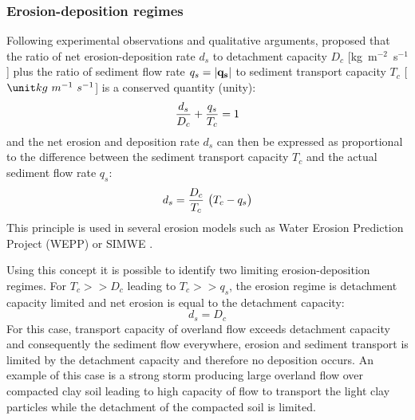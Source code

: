 \documentclass[gmd, manuscript]{copernicus}
\begin{document}
\subsubsection{Erosion-deposition regimes}

Following experimental observations and qualitative arguments, \cite{Foster1977} 
proposed that the ratio of net erosion-deposition rate $d_s$ to detachment
 capacity  $D_c$  [\unit{kg~m}$^{-2}$~\unit{s}$^{-1}$] 
 plus the ratio of sediment flow rate $q_s = |{\bf q_s}|$ 
to sediment transport capacity $T_c$ [$\unit kg~m^{-1}~s^{-1}$] is
 a conserved quantity (unity):
\begin{equation}
\label{eq:foster_law}
{d_s \over D_c} + {q_s \over T_c} = 1
\end{equation}
and the net erosion and deposition rate $d_s$ can then be expressed as proportional to the difference between
the sediment transport capacity $T_c$ and the actual sediment flow rate $q_s$:
\begin{equation}
\label{eq:sigma}
d_s = {D_c \over T_c}~\bigl( T_c - q_s\bigr)
\end{equation}
\noindent
This principle is used in several erosion models such as Water Erosion Prediction Project (WEPP)
\citep{Flanagan2013} or SIMWE \citep{Mitas1998}. 

Using this concept it is possible to identify two limiting erosion-deposition regimes.
For $T_c >> D_c$ leading to $T_c >> q_s$, the erosion regime is detachment capacity limited and
net erosion is equal to the detachment capacity:
\begin{equation}
\label{eq:detachment_limited}
 d_s = D_c
\end{equation}
For this case, transport capacity of overland flow exceeds
detachment capacity and consequently the sediment flow everywhere, 
erosion and sediment transport is limited by the detachment
capacity and therefore no deposition occurs.
An example of this case is a strong storm producing large overland flow over compacted clay soil 
leading to high capacity of flow to transport the light clay particles
while the detachment of the compacted soil is limited.
\end{document}
